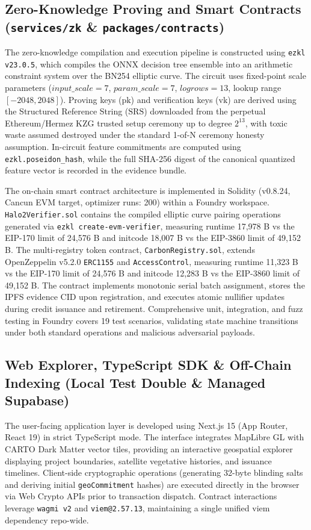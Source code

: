 \documentclass[preprint,12pt]{elsarticle}
\begin{document}
\subsection{Zero-Knowledge Proving and Smart Contracts (\texttt{services/zk} \& \texttt{packages/contracts})}

The zero-knowledge compilation and execution pipeline is constructed using \texttt{ezkl v23.0.5}, which compiles the ONNX decision tree ensemble into an arithmetic constraint system over the BN254 elliptic curve. The circuit uses fixed-point scale parameters ($input\_scale = 7$, $param\_scale = 7$, $logrows = 13$, lookup range $[-2048, 2048]$). Proving keys ($\text{pk}$) and verification keys ($\text{vk}$) are derived using the Structured Reference String ($\text{SRS}$) downloaded from the perpetual Ethereum/Hermez KZG trusted setup ceremony up to degree $2^{13}$, with toxic waste assumed destroyed under the standard 1-of-N ceremony honesty assumption. In-circuit feature commitments are computed using \texttt{ezkl.poseidon\_hash}, while the full SHA-256 digest of the canonical quantized feature vector is recorded in the evidence bundle.

The on-chain smart contract architecture is implemented in Solidity (v0.8.24, Cancun EVM target, optimizer runs: 200) within a Foundry workspace. \texttt{Halo2Verifier.sol} contains the compiled elliptic curve pairing operations generated via \texttt{ezkl create-evm-verifier}, measuring runtime 17,978 B vs the EIP-170 limit of 24,576 B and initcode 18,007 B vs the EIP-3860 limit of 49,152 B. The multi-registry token contract, \texttt{CarbonRegistry.sol}, extends OpenZeppelin v5.2.0 \texttt{ERC1155} and \texttt{AccessControl}, measuring runtime 11,323 B vs the EIP-170 limit of 24,576 B and initcode 12,283 B vs the EIP-3860 limit of 49,152 B. The contract implements monotonic serial batch assignment, stores the IPFS evidence CID upon registration, and executes atomic nullifier updates during credit issuance and retirement. Comprehensive unit, integration, and fuzz testing in Foundry covers 19 test scenarios, validating state machine transitions under both standard operations and malicious adversarial payloads.

\subsection{Web Explorer, TypeScript SDK \& Off-Chain Indexing (Local Test Double \& Managed Supabase)}

The user-facing application layer is developed using Next.js 15 (App Router, React 19) in strict TypeScript mode. The interface integrates MapLibre GL with CARTO Dark Matter vector tiles, providing an interactive geospatial explorer displaying project boundaries, satellite vegetative histories, and issuance timelines. Client-side cryptographic operations (generating 32-byte blinding salts and deriving initial \texttt{geoCommitment} hashes) are executed directly in the browser via Web Crypto APIs prior to transaction dispatch. Contract interactions leverage \texttt{wagmi v2} and \texttt{viem@2.57.13}, maintaining a single unified viem dependency repo-wide.
\end{document}
